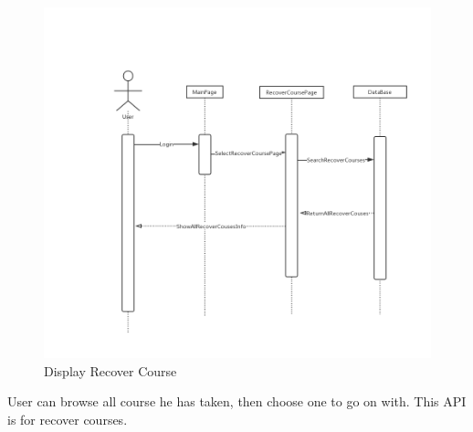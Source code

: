 \documentclass[16pt]{scrreprt}
\begin{document}
\begin{figure}[H]
    \includegraphics[width=\linewidth]{./FuncPhoto/6.png}   
    \caption{Display Recover Course}
\end{figure}
User can browse all course he has taken, then choose one to go on with. This API is for recover courses. 
\end{document}
